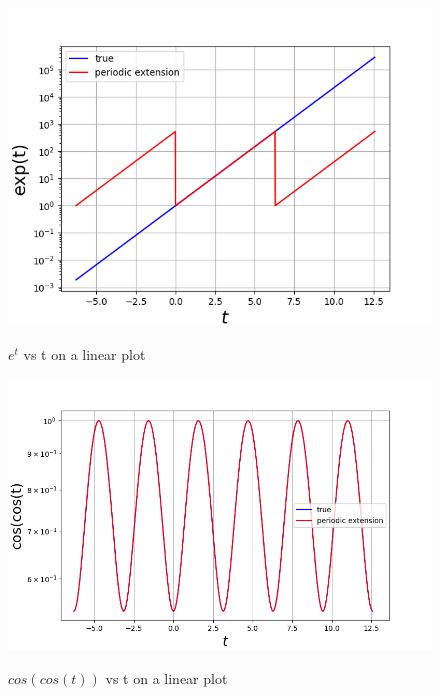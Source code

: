 \documentclass[11pt, a4paper]{article}
\begin{document}
\begin{figure}[!tbh]
   	\centering
   	\includegraphics[scale=0.5]{Figure_11.png}
   	\label{fig:11}
   	\caption{$e^{t}$ vs t on a linear plot}
   \end{figure}
\begin{figure}[!tbh]
   	\centering
   	\includegraphics[scale=0.5]{Figure_21.png}
   	\label{fig:21}
   	\caption{$cos(cos(t))$ vs t on a linear plot}
   \end{figure}
\end{document}

